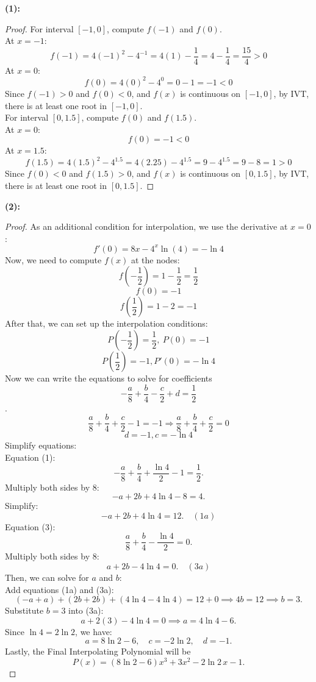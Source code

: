 \documentclass{article}
\begin{document}
\textbf{(1): }
\\
\begin{proof}
    For interval $[-1, 0]$, compute $f(-1)$ and $f(0)$.
    \\
    At $x = -1$:
    \[ f(-1) = 4(-1)^2 - 4^{-1} = 4(1) - \frac{1}{4} = 4 - \frac{1}{4} = \frac{15}{4} > 0 \]
    At $x = 0$:
    \[ f(0) = 4(0)^2 - 4^{0} = 0 - 1 = -1 < 0 \]
    Since $f(-1) > 0$ and $f(0) < 0$, and $f(x)$ is continuous on $[-1, 0]$, by IVT, there is at least one root in $[-1, 0]$.
    \\
    For interval $[0, 1.5]$, compute $f(0)$ and $f(1.5)$.
    \\
    At $x = 0$:
    \[ f(0) = -1 < 0 \]
    At $x = 1.5$:
    \[ f(1.5) = 4(1.5)^2 - 4^{1.5} = 4(2.25) - 4^{1.5} = 9 - 4^{1.5} = 9 - 8 = 1 > 0 \]
    Since $f(0) < 0$ and $f(1.5) > 0$, and $f(x)$ is continuous on $[0, 1.5]$, by IVT, there is at least one root in $[0, 1.5]$.
\end{proof}

\textbf{(2): }
\begin{proof}
As an additional condition for interpolation, we use the derivative at \( x = 0 \):
\[ f'(0) = 8x - 4^x \ln(4) = -\ln 4 \]
Now, we need to compute \( f(x) \) at the nodes:
\[ f\left( -\dfrac{1}{2} \right) = 1 - \dfrac{1}{2} = \dfrac{1}{2} \]
\[ f(0) = -1 \]
\[ f\left( \dfrac{1}{2} \right) = 1 - 2 = -1 \]
After that, we can set up the interpolation conditions:
\[ P\left( -\dfrac{1}{2} \right) = \dfrac{1}{2}, \ P(0) = -1 \]
\[ P\left( \dfrac{1}{2} \right) = -1, P'(0) = -\ln 4 \]
Now we can write the equations to solve for coefficients
\[ -\dfrac{a}{8} + \dfrac{b}{4} - \dfrac{c}{2} + d = \dfrac{1}{2} \].
\[ \dfrac{a}{8} + \dfrac{b}{4} + \dfrac{c}{2} -1 = -1 \Rightarrow \dfrac{a}{8} + \dfrac{b}{4} + \dfrac{c}{2} = 0 \]
\[ d = -1, c = -\ln 4 \]
Simplify equations:
\\
Equation (1):
\[
-\dfrac{a}{8} + \dfrac{b}{4} + \dfrac{\ln 4}{2} -1 = \dfrac{1}{2}.
\]
Multiply both sides by 8:
\[
- a + 2b + 4 \ln 4 -8 = 4.
\]
Simplify:
\[
- a + 2b + 4 \ln 4 = 12. \quad (1a)
\]
Equation (3):
\[
\dfrac{a}{8} + \dfrac{b}{4} - \dfrac{\ln 4}{2} = 0.
\]
Multiply both sides by 8:
\[
a + 2b - 4 \ln 4 = 0. \quad (3a)
\]
Then, we can solve for \( a \) and \( b \):
\\
Add equations (1a) and (3a):
\[
(-a + a) + (2b + 2b) + (4 \ln 4 - 4 \ln 4) = 12 + 0 \implies 4b = 12 \implies b = 3.
\]
Substitute \( b = 3 \) into (3a):
\[
a + 2(3) - 4 \ln 4 = 0 \implies a = 4 \ln 4 -6.
\]
Since \( \ln 4 = 2 \ln 2 \), we have:
\[
a = 8 \ln 2 -6, \quad c = -2 \ln 2, \quad d = -1.
\]
Lastly, the Final Interpolating Polynomial will be
\[
    P(x) = (8 \ln 2 -6) x^3 + 3 x^2 - 2 \ln 2 \, x -1.
\]
\end{proof}
\end{document}
